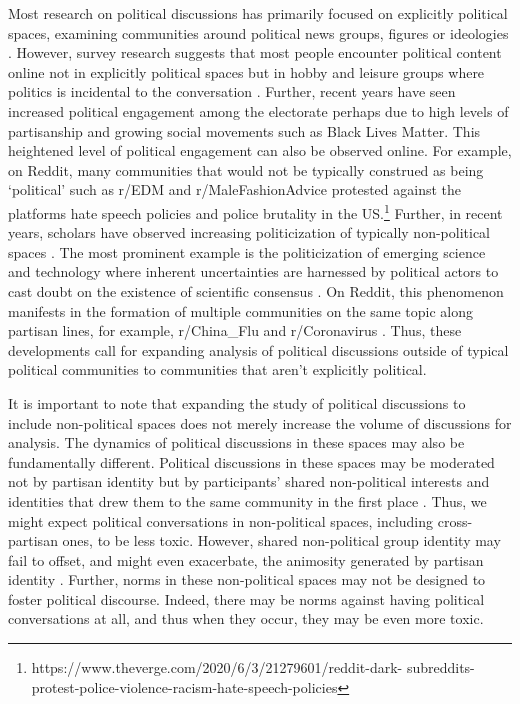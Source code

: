 \documentclass[letterpaper]{article} %
\begin{document}
Most research on political discussions has primarily focused on explicitly political spaces, examining communities around political news groups, figures or ideologies \cite{soliman2019characterization,himelboim2009discussion,an2019political}. However, survey research suggests that most people encounter political content online not in explicitly political spaces but in hobby and leisure groups where politics is incidental to the conversation \cite{wojcieszak2009online}. Further, recent years have seen increased political engagement among the electorate perhaps due to high levels of partisanship \cite{huddy2015expressive} and growing social movements \cite{bosi2016consequences} such as Black Lives Matter. This heightened level of political engagement can also be observed online. For example, on Reddit, many communities that would not be typically construed as being `political' such as r/EDM and r/MaleFashionAdvice protested against the platforms hate speech policies and police brutality in the US.\footnote{https://www.theverge.com/2020/6/3/21279601/reddit-dark- subreddits-protest-police-violence-racism-hate-speech-policies} Further, in recent years, scholars have observed increasing politicization of typically non-political spaces \cite{dagnes2019us}. The most prominent example is the politicization of emerging science and technology where inherent uncertainties are harnessed by political actors to cast doubt on the existence of scientific consensus \cite{bolsen2015counteracting}. On Reddit, this phenomenon manifests in the formation of multiple communities on the same topic along partisan lines, for example, r/China\_Flu and r/Coronavirus \cite{zhang2020tale}. Thus, these developments call for expanding analysis of political discussions outside of typical political communities to communities that aren't explicitly political.


It is important to note that expanding the study of political discussions to include non-political spaces does not merely increase the volume of discussions for analysis. The dynamics of political discussions in these spaces may also be fundamentally different. Political discussions in these spaces may be moderated not by partisan identity but by participants' shared non-political interests and identities that drew them to the same community in the first place \cite{gaertner2011common}. Thus, we might expect political conversations in non-political spaces, including cross-partisan ones, to be less toxic. 
However, 
shared non-political group identity may fail to offset, and might even exacerbate, the animosity generated by partisan identity \cite{klar2018common}. Further, norms in these non-political spaces may not be designed to foster political discourse. Indeed, there may be norms against having political conversations at all, and thus when they occur, they may be even more toxic.
\end{document}
